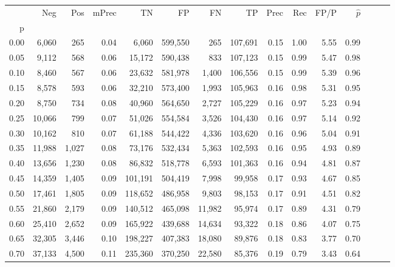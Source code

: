 \begin{tabular}{rrrrrrrrrrrrrrr}
\toprule
{} &     Neg &     Pos & mPrec &       TN &       FP &       FN &       TP &  Prec &   Rec &  FP/P & $\hat{p}$ \\
p    &         &         &       &          &          &          &          &       &       &       &           \\
\midrule
0.00 &   6,060 &     265 &  0.04 &    6,060 &  599,550 &      265 &  107,691 &  0.15 &  1.00 &  5.55 &      0.99 \\
0.05 &   9,112 &     568 &  0.06 &   15,172 &  590,438 &      833 &  107,123 &  0.15 &  0.99 &  5.47 &      0.98 \\
0.10 &   8,460 &     567 &  0.06 &   23,632 &  581,978 &    1,400 &  106,556 &  0.15 &  0.99 &  5.39 &      0.96 \\
0.15 &   8,578 &     593 &  0.06 &   32,210 &  573,400 &    1,993 &  105,963 &  0.16 &  0.98 &  5.31 &      0.95 \\
0.20 &   8,750 &     734 &  0.08 &   40,960 &  564,650 &    2,727 &  105,229 &  0.16 &  0.97 &  5.23 &      0.94 \\
0.25 &  10,066 &     799 &  0.07 &   51,026 &  554,584 &    3,526 &  104,430 &  0.16 &  0.97 &  5.14 &      0.92 \\
0.30 &  10,162 &     810 &  0.07 &   61,188 &  544,422 &    4,336 &  103,620 &  0.16 &  0.96 &  5.04 &      0.91 \\
0.35 &  11,988 &   1,027 &  0.08 &   73,176 &  532,434 &    5,363 &  102,593 &  0.16 &  0.95 &  4.93 &      0.89 \\
0.40 &  13,656 &   1,230 &  0.08 &   86,832 &  518,778 &    6,593 &  101,363 &  0.16 &  0.94 &  4.81 &      0.87 \\
0.45 &  14,359 &   1,405 &  0.09 &  101,191 &  504,419 &    7,998 &   99,958 &  0.17 &  0.93 &  4.67 &      0.85 \\
0.50 &  17,461 &   1,805 &  0.09 &  118,652 &  486,958 &    9,803 &   98,153 &  0.17 &  0.91 &  4.51 &      0.82 \\
0.55 &  21,860 &   2,179 &  0.09 &  140,512 &  465,098 &   11,982 &   95,974 &  0.17 &  0.89 &  4.31 &      0.79 \\
0.60 &  25,410 &   2,652 &  0.09 &  165,922 &  439,688 &   14,634 &   93,322 &  0.18 &  0.86 &  4.07 &      0.75 \\
0.65 &  32,305 &   3,446 &  0.10 &  198,227 &  407,383 &   18,080 &   89,876 &  0.18 &  0.83 &  3.77 &      0.70 \\
0.70 &  37,133 &   4,500 &  0.11 &  235,360 &  370,250 &   22,580 &   85,376 &  0.19 &  0.79 &  3.43 &      0.64 \\

\end{tabular}
